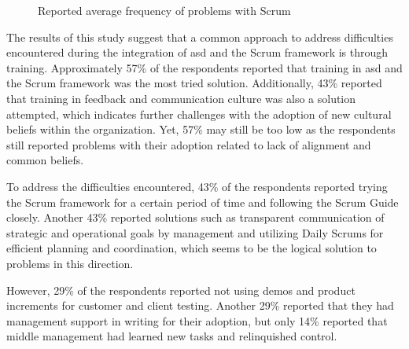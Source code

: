 \begin{figure}[!ht]
	\begin{center}
        \caption{Reported average frequency of problems with Scrum}\label{fig:problems-with-scrum}
    \end{center}
\end{figure}

The results of this study suggest that a common approach to address difficulties encountered during the integration of \ac{asd} and the Scrum \gls{framework} is through training. Approximately 57\% of the respondents reported that training in \ac{asd} and the Scrum \gls{framework} was the most tried solution. Additionally, 43\% reported that training in feedback and communication culture was also a solution attempted, which indicates further challenges with the \gls{adoption} of new cultural beliefs within the organization. Yet, 57\% may still be too low as the respondents still reported problems with their \gls{adoption} related to lack of alignment and common beliefs.

To address the difficulties encountered, 43\% of the respondents reported trying the Scrum \gls{framework} for a certain period of time and following the Scrum Guide closely. Another 43\% reported solutions such as transparent communication of strategic and operational goals by management and utilizing Daily Scrums for efficient planning and coordination, which seems to be the logical solution to problems in this direction.

However, 29\% of the respondents reported not using demos and product increments for \gls{customer} and \gls{client} testing. Another 29\% reported that they had management support in writing for their \gls{adoption}, but only 14\% reported that middle management had learned new tasks and relinquished control.

